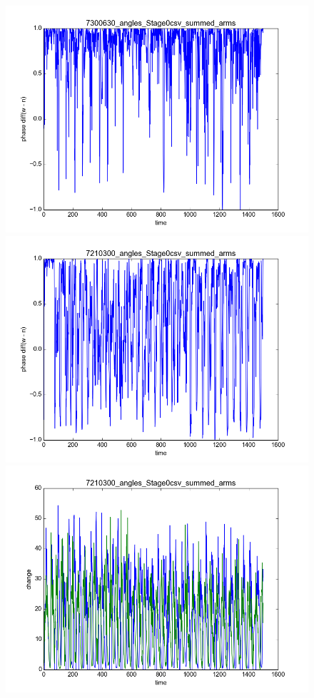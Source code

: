 \documentclass[12pt]{article}
\begin{document}
\begin{figure}\label{fig:hilbert_plots}
  \begin{center}
    \includegraphics[scale=0.4]{hilbert_1}
    \includegraphics[scale=0.4]{hilbert_2}
    \includegraphics[scale=0.4]{time_1}

\end{center}
\end{figure}
\end{document}
